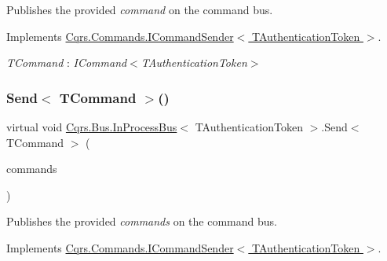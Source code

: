 Publishes the provided {\itshape command}  on the command bus. 



Implements \hyperlink{interfaceCqrs_1_1Commands_1_1ICommandSender_a551d69f8679399fc0ce0fd99dead507a_a551d69f8679399fc0ce0fd99dead507a}{Cqrs.\+Commands.\+I\+Command\+Sender$<$ T\+Authentication\+Token $>$}.

\begin{Desc}
\item[Type Constraints]\begin{description}
\item[{\em T\+Command} : {\em I\+Command$<$T\+Authentication\+Token$>$}]\end{description}
\end{Desc}
\mbox{\label{classCqrs_1_1Bus_1_1InProcessBus_ae5dae5f2445387280c974ec181167055_ae5dae5f2445387280c974ec181167055}} 
\subsubsection{\texorpdfstring{Send$<$ T\+Command $>$()}{Send< TCommand >()}\hspace{0.1cm}{\footnotesize\ttfamily [2/2]}}
{\footnotesize\ttfamily virtual void \hyperlink{classCqrs_1_1Bus_1_1InProcessBus}{Cqrs.\+Bus.\+In\+Process\+Bus}$<$ T\+Authentication\+Token $>$.Send$<$ T\+Command $>$ (\begin{DoxyParamCaption}\item[{I\+Enumerable$<$ T\+Command $>$}]{commands }\end{DoxyParamCaption})\hspace{0.3cm}{\ttfamily [virtual]}}



Publishes the provided {\itshape commands}  on the command bus. 



Implements \hyperlink{interfaceCqrs_1_1Commands_1_1ICommandSender_a3fb3ec40a3e862f721a7c9204e67e832_a3fb3ec40a3e862f721a7c9204e67e832}{Cqrs.\+Commands.\+I\+Command\+Sender$<$ T\+Authentication\+Token $>$}.

